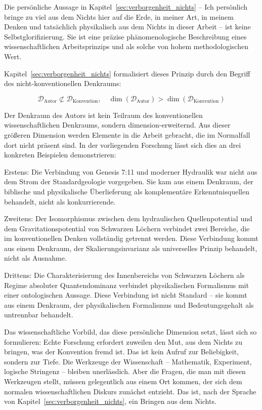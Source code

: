 ﻿\documentclass[12pt,a4paper]{report}
\begin{document}
Die persönliche Aussage in Kapitel~\ref{sec:verborgenheit_nichts} -- \glqq Ich persönlich bringe zu viel aus dem Nichts hier auf die Erde, in meiner Art, in meinem Denken und tatsächlich physikalisch aus dem Nichts in dieser Arbeit\grqq{} -- ist keine Selbstglorifizierung. Sie ist eine präzise phänomenologische Beschreibung eines wissenschaftlichen Arbeitsprinzips und als solche von hohem methodologischen Wert.

Kapitel~\ref{sec:verborgenheit_nichts} formalisiert dieses Prinzip durch den Begriff des nicht-konventionellen Denkraums:

\begin{equation}
	\mathcal{D}_{\text{Autor}} \not\subset \mathcal{D}_{\text{Konvention}}, \quad \dim(\mathcal{D}_{\text{Autor}}) > \dim(\mathcal{D}_{\text{Konvention}})
\end{equation}

Der Denkraum des Autors ist kein Teilraum des konventionellen wissenschaftlichen Denkraums, sondern dimension-erweiternd. Aus dieser größeren Dimension werden Elemente in die Arbeit gebracht, die im Normalfall dort nicht präsent sind. In der vorliegenden Forschung lässt sich dies an drei konkreten Beispielen demonstrieren:

Erstens: Die Verbindung von Genesis 7:11 und moderner Hydraulik war nicht aus dem Strom der Standardgeologie vorgegeben. Sie kam aus einem Denkraum, der biblische und physikalische Überlieferung als komplementäre Erkenntnisquellen behandelt, nicht als konkurrierende.

Zweitens: Der Isomorphismus zwischen dem hydraulischen Quellenpotential und dem Gravitationspotential von Schwarzen Löchern verbindet zwei Bereiche, die im konventionellen Denken vollständig getrennt werden. Diese Verbindung kommt aus einem Denkraum, der Skalierungsinvarianz als universelles Prinzip behandelt, nicht als Ausnahme.

Drittens: Die Charakterisierung des Innenbereichs von Schwarzen Löchern als \glqq Regime absoluter Quantendominanz\grqq{} verbindet physikalischen Formalismus mit einer ontologischen Aussage. Diese Verbindung ist nicht Standard -- sie kommt aus einem Denkraum, der physikalischen Formalismus und Bedeutungsgehalt als untrennbar behandelt.

Das wissenschaftliche Vorbild, das diese persönliche Dimension setzt, lässt sich so formulieren: Echte Forschung erfordert zuweilen den Mut, aus dem Nichts zu bringen, was der Konvention fremd ist. Das ist kein Aufruf zur Beliebigkeit, sondern zur Tiefe. Die Werkzeuge der Wissenschaft -- Mathematik, Experiment, logische Stringenz -- bleiben unerlässlich. Aber die Fragen, die man mit diesen Werkzeugen stellt, müssen gelegentlich aus einem Ort kommen, der sich dem normalen wissenschaftlichen Diskurs zunächst entzieht. Das ist, nach der Sprache von Kapitel~\ref{sec:verborgenheit_nichts}, ein Bringen aus dem Nichts.
\end{document}
